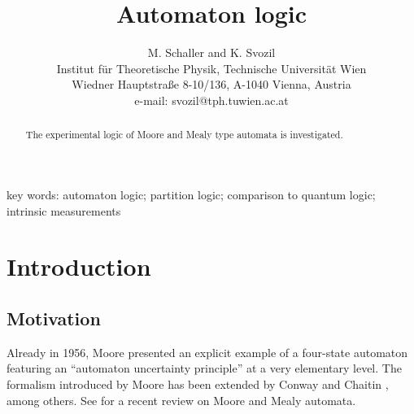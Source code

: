 \RequirePackage{mathptm}
\RequirePackage{times}


\newtheorem{theorem}{Theorem}[subsection]
\newtheorem{defin}[theorem]{Definition}
\newtheorem{lemma}[theorem]{Lemma}
\newtheorem{corollary}[theorem]{Corollary}

 \title{Automaton logic}
\author{M. Schaller and K. Svozil\\
 {\small Institut f\"ur Theoretische Physik,
Technische Universit\"at Wien   }     \\
  {\small Wiedner Hauptstra\ss e 8-10/136,
A-1040 Vienna, Austria   }            \\
  {\small e-mail: svozil@tph.tuwien.ac.at}
}
\date{}
\maketitle

\begin{abstract}
The experimental logic of Moore and Mealy type automata is investigated.
\end{abstract}
\begin{flushleft}
key words: automaton logic; partition logic;
comparison to quantum logic;
intrinsic measurements
\end{flushleft}



\section{Introduction}

\subsection{Motivation}

Already in 1956, Moore
\cite{moore}
presented an
explicit example of a four-state automaton featuring
an ``automaton uncertainty principle'' at a very elementary level.
The formalism introduced by Moore has been extended by Conway
\cite{conway} and Chaitin \cite{chaitin-65}, among others.
See \cite{hopcroft,brauer}
for a recent review on Moore and Mealy automata.


